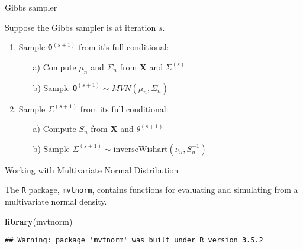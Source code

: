 \documentclass[ignorenonframetext,]{beamer}
\newenvironment{Shaded}{\begin{snugshade}}{\end{snugshade}}
\newcommand{\KeywordTok}[1]{\textcolor[rgb]{0.13,0.29,0.53}{\textbf{#1}}}
\newcommand{\NormalTok}[1]{#1}
\newcommand{\btheta}{{\bm\theta}}
\newcommand{\bX}   {\bm{X}}
\begin{document}
\begin{frame}{Gibbs sampler}

Suppose the Gibbs sampler is at iteration \(s.\)

\begin{enumerate}
\item Sample $\btheta^{(s+1)}$ from it's full conditional:
\begin{enumerate}
\item[a)] Compute $\mu_n$ and $\Sigma_n$ from $\bX$ and $\Sigma^{(s)}$
\item[b)] Sample $\btheta^{(s+1)}\sim MVN(\mu_n, \Sigma_n)$
\end{enumerate}
\item Sample $\Sigma^{(s+1)}$ from its full conditional:
\begin{enumerate}
\item[a)] Compute $S_n$ from $\bX$ and $\theta^{(s+1)}$
\item[b)] Sample $\Sigma^{(s+1)} \sim \text{inverseWishart}(\nu_n, S_n^{-1})$
\end{enumerate}
\end{enumerate}

\end{frame}

\begin{frame}[fragile]{Working with Multivariate Normal Distribution}

The \texttt{R} package, \texttt{mvtnorm}, contains functions for
evaluating and simulating from a multivariate normal density.

\begin{Shaded}
\begin{Highlighting}[]
\KeywordTok{library}\NormalTok{(mvtnorm)}
\end{Highlighting}
\end{Shaded}

\begin{verbatim}
## Warning: package 'mvtnorm' was built under R version 3.5.2
\end{verbatim}

\end{frame}
\end{document}
